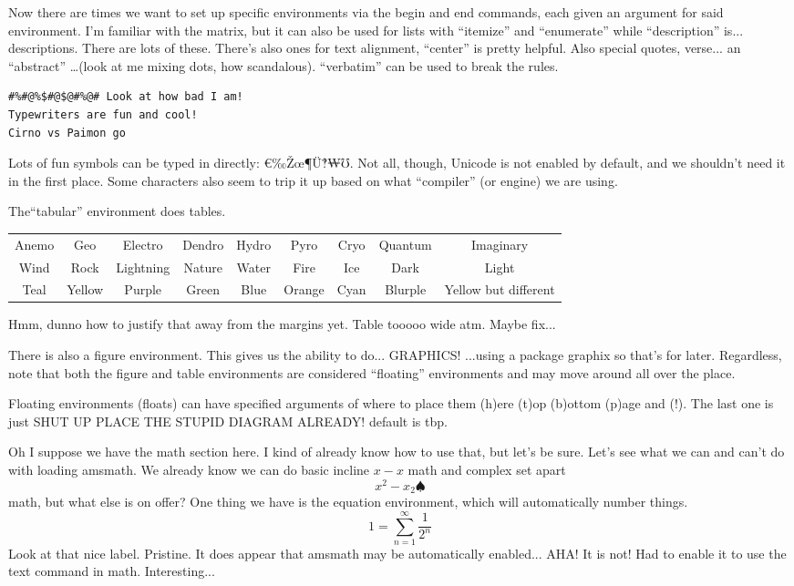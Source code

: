 \documentclass{article}
\begin{document}
Now there are times we want to set up specific environments via the begin and end commands, each given an argument for said environment. I'm familiar with the matrix, but it can also be used for lists with ``itemize'' and ``enumerate'' while ``description'' is... descriptions. There are lots of these. There's also ones for text alignment, ``center'' is pretty helpful. Also special quotes, verse... an ``abstract'' \ldots (look at me mixing dots, how scandalous). ``verbatim'' can be used to break the rules. 

\begin{verbatim}
#%#@%$#@$@#%@# Look at how bad I am!
Typewriters are fun and cool!
Cirno vs Paimon go
\end{verbatim}

Lots of fun symbols can be typed in directly: €‰Žœ¶Ü‽₩℧. Not all, though, Unicode is not enabled by default, and we shouldn't need it in the first place. Some characters also seem to trip it up based on what ``compiler'' (or engine) we are using. 

The``tabular'' environment does tables. 

\begin{tabular}{c|c|c|c|c|c|c|c|c}
Anemo & Geo & Electro & Dendro & Hydro & Pyro & Cryo & Quantum & Imaginary \\ 
Wind & Rock & Lightning & Nature & Water & Fire & Ice & Dark & Light \\
Teal & Yellow & Purple & Green & Blue & Orange & Cyan & Blurple & Yellow but different
\end{tabular}

Hmm, dunno how to justify that away from the margins yet. Table tooooo wide atm. Maybe fix...

There is also a figure environment. This gives us the ability to do... GRAPHICS! ...using a package graphix so that's for later. Regardless, note that both the figure and table environments are considered ``floating'' environments and may move around all over the place.

Floating environments (floats) can have specified arguments of where to place them (h)ere (t)op (b)ottom (p)age and (!). The last one is just SHUT UP PLACE THE STUPID DIAGRAM ALREADY! default is tbp. 

Oh I suppose we have the math section here. I kind of already know how to use that, but let's be sure. Let's see what we can and can't do with loading amsmath. We already know we can do basic incline $x-x$ math and complex set apart \[x^2-x_2 \spadesuit\] math, but what else is on offer? One thing we have is the equation environment, which will automatically number things.
\begin{equation} 
1 = \sum^\infty_{n=1} \frac{1}{2^n}
\end{equation}
Look at that nice label. Pristine. It does appear that amsmath may be automatically enabled... AHA! It is not! Had to enable it to use the text command in math. Interesting... 
\end{document}
